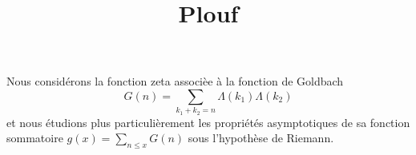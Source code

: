 \documentclass[12pt]{article}
\title{Plouf
}
\author{
}
\begin{document}
%
%
Nous consid\'erons la fonction zeta associ\`ee \`a la
      fonction de Goldbach
      \begin{equation*}
        G(n)=\sum_{k_1+k_2=n}\Lambda(k_1)\Lambda(k_2)
      \end{equation*}
      et nous \'etudions plus particuli\`erement les
      propri\'et\'es asymptotiques de sa fonction sommatoire
      $g(x)=\sum_{n\le x} G(n)$
      sous l'hypoth\`ese de Riemann.
\end{document}
